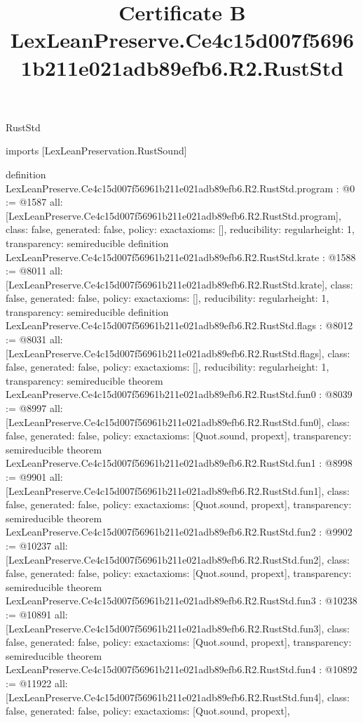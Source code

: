 \begin{lexlean}{RustStd}
\title{Certificate B LexLeanPreserve.Ce4c15d007f56961b211e021adb89efb6.R2.RustStd}
\begin{coremodule}
imports [LexLeanPreservation.RustSound]

definition LexLeanPreserve.Ce4c15d007f56961b211e021adb89efb6.R2.RustStd.program : @0 := @1587 {
  all: [LexLeanPreserve.Ce4c15d007f56961b211e021adb89efb6.R2.RustStd.program],
  class: false,
  generated: false,
  policy: exact{axioms: []},
  reducibility: regular{height: 1},
  transparency: semireducible
}
definition LexLeanPreserve.Ce4c15d007f56961b211e021adb89efb6.R2.RustStd.krate : @1588 := @8011 {
  all: [LexLeanPreserve.Ce4c15d007f56961b211e021adb89efb6.R2.RustStd.krate],
  class: false,
  generated: false,
  policy: exact{axioms: []},
  reducibility: regular{height: 1},
  transparency: semireducible
}
definition LexLeanPreserve.Ce4c15d007f56961b211e021adb89efb6.R2.RustStd.flags : @8012 := @8031 {
  all: [LexLeanPreserve.Ce4c15d007f56961b211e021adb89efb6.R2.RustStd.flags],
  class: false,
  generated: false,
  policy: exact{axioms: []},
  reducibility: regular{height: 1},
  transparency: semireducible
}
theorem LexLeanPreserve.Ce4c15d007f56961b211e021adb89efb6.R2.RustStd.fun0 : @8039 := @8997 {
  all: [LexLeanPreserve.Ce4c15d007f56961b211e021adb89efb6.R2.RustStd.fun0],
  class: false,
  generated: false,
  policy: exact{axioms: [Quot.sound, propext]},
  transparency: semireducible
}
theorem LexLeanPreserve.Ce4c15d007f56961b211e021adb89efb6.R2.RustStd.fun1 : @8998 := @9901 {
  all: [LexLeanPreserve.Ce4c15d007f56961b211e021adb89efb6.R2.RustStd.fun1],
  class: false,
  generated: false,
  policy: exact{axioms: [Quot.sound, propext]},
  transparency: semireducible
}
theorem LexLeanPreserve.Ce4c15d007f56961b211e021adb89efb6.R2.RustStd.fun2 : @9902 := @10237 {
  all: [LexLeanPreserve.Ce4c15d007f56961b211e021adb89efb6.R2.RustStd.fun2],
  class: false,
  generated: false,
  policy: exact{axioms: [Quot.sound, propext]},
  transparency: semireducible
}
theorem LexLeanPreserve.Ce4c15d007f56961b211e021adb89efb6.R2.RustStd.fun3 : @10238 := @10891 {
  all: [LexLeanPreserve.Ce4c15d007f56961b211e021adb89efb6.R2.RustStd.fun3],
  class: false,
  generated: false,
  policy: exact{axioms: [Quot.sound, propext]},
  transparency: semireducible
}
theorem LexLeanPreserve.Ce4c15d007f56961b211e021adb89efb6.R2.RustStd.fun4 : @10892 := @11922 {
  all: [LexLeanPreserve.Ce4c15d007f56961b211e021adb89efb6.R2.RustStd.fun4],
  class: false,
  generated: false,
  policy: exact{axioms: [Quot.sound, propext]},
}
\end{coremodule}
\end{lexlean}
